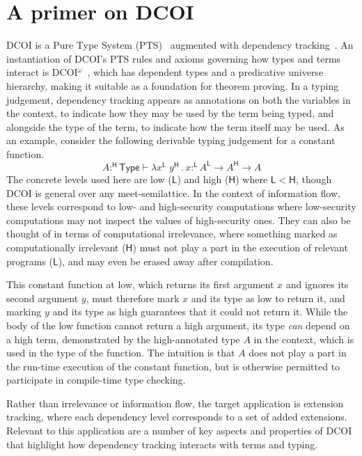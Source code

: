 \documentclass{article}
\newcommand{\kw}[1]{\mathsf{#1}}
\newcommand{\HH}{\mathsf{H}}
\newcommand{\LL}{\mathsf{L}}
\begin{document}
\section{A primer on DCOI} \label{sec:dcoi}

DCOI is a Pure Type System (PTS)~\citep{pts} augmented with dependency tracking~\cite{dcc}.
An instantiation of DCOI's PTS rules and axioms governing how types and terms interact
is DCOI$^\omega$~\citep{dcoi-omega},
which has dependent types and a predicative universe hierarchy,
making it suitable as a foundation for theorem proving.
In a typing judgement, dependency tracking appears as annotations
on both the variables in the context,
to indicate how they may be used by the term being typed,
and alongside the type of the term,
to indicate how the term itself may be used.
As an example, consider the following derivable typing judgement for a constant function.
$$A :^\HH \kw{Type} \vdash \lambda x^\LL \; y^\HH \mathpunct{.} x :^\LL
  A^\LL \to A^\HH \to A$$
The concrete levels used here are low ($\LL$) and high ($\HH$) where $\LL < \HH$,
though DCOI is general over any meet-semilattice.
In the context of information flow,
these levels correspond to low- and high-security computations
where low-security computations may not inspect the values of high-security ones.
They can also be thought of in terms of computational irrelevance,
where something marked as computationally irrelevant ($\HH$)
must not play a part in the execution of relevant programs ($\LL$),
and may even be erased away after compilation.

This constant function at low,
which returns its first argument $x$ and ignores its second argument $y$,
must therefore mark $x$ and its type as low to return it,
and marking $y$ and its type as high guarantees that it could not return it.
While the body of the low function cannot return a high argument,
its type \emph{can} depend on a high term,
demonstrated by the high-annotated type $A$ in the context,
which is used in the type of the function.
The intuition is that $A$ does not play a part in the run-time execution of the constant function,
but is otherwise permitted to participate in compile-time type checking.

Rather than irrelevance or information flow,
the target application is extension tracking,
where each dependency level corresponds to a set of added extensions.
Relevant to this application are a number of key aspects and properties of DCOI
that highlight how dependency tracking interacts with terms and typing.
\end{document}
